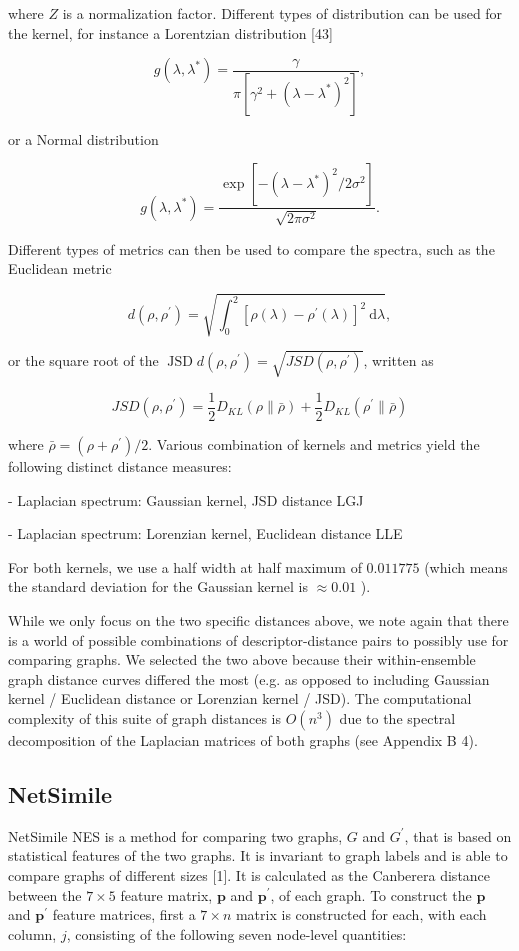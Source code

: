 where $Z$ is a normalization factor. Different types of distribution can be used for the kernel, for instance a Lorentzian distribution [43]

$$
g\left(\lambda, \lambda^{*}\right)=\frac{\gamma}{\pi\left[\gamma^{2}+\left(\lambda-\lambda^{*}\right)^{2}\right]},
$$

or a Normal distribution

$$
g\left(\lambda, \lambda^{*}\right)=\frac{\exp \left[-\left(\lambda-\lambda^{*}\right)^{2} / 2 \sigma^{2}\right]}{\sqrt{2 \pi \sigma^{2}}} .
$$

Different types of metrics can then be used to compare the spectra, such as the Euclidean metric

$$
d\left(\rho, \rho^{\prime}\right)=\sqrt{\int_{0}^{2}\left[\rho(\lambda)-\rho^{\prime}(\lambda)\right]^{2} \mathrm{~d} \lambda},
$$

or the square root of the $\operatorname{JSD} d\left(\rho, \rho^{\prime}\right)=\sqrt{J S D\left(\rho, \rho^{\prime}\right)}$, written as

$$
J S D\left(\rho, \rho^{\prime}\right)=\frac{1}{2} D_{K L}(\rho \| \bar{\rho})+\frac{1}{2} D_{K L}\left(\rho^{\prime} \| \bar{\rho}\right)
$$

where $\bar{\rho}=\left(\rho+\rho^{\prime}\right) / 2$. Various combination of kernels and metrics yield the following distinct distance measures:

- Laplacian spectrum: Gaussian kernel, JSD distance LGJ

- Laplacian spectrum: Lorenzian kernel, Euclidean distance LLE

For both kernels, we use a half width at half maximum of $0.011775$ (which means the standard deviation for the Gaussian kernel is $\approx 0.01$ ).

While we only focus on the two specific distances above, we note again that there is a world of possible combinations of descriptor-distance pairs to possibly use for comparing graphs. We selected the two above because their within-ensemble graph distance curves differed the most (e.g. as opposed to including Gaussian kernel / Euclidean distance or Lorenzian kernel / JSD). The computational complexity of this suite of graph distances is $O\left(n^{3}\right)$ due to the spectral decomposition of the Laplacian matrices of both graphs (see Appendix B 4).

\subsection{NetSimile}
NetSimile NES is a method for comparing two graphs, $G$ and $G^{\prime}$, that is based on statistical features of the two graphs. It is invariant to graph labels and is able to compare graphs of different sizes [1]. It is calculated as the Canberera distance between the $7 \times 5$ feature matrix, $\mathbf{p}$ and $\mathbf{p}^{\prime}$, of each graph. To construct the $\mathbf{p}$ and $\mathbf{p}^{\prime}$ feature matrices, first a $7 \times n$ matrix is constructed for each, with each column, $j$, consisting of the following seven node-level quantities:

